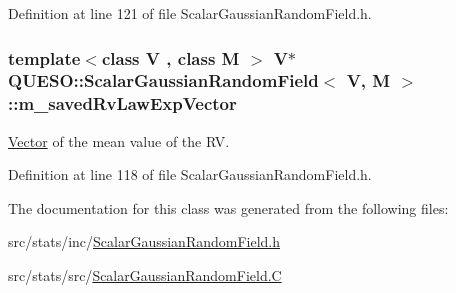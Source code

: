 Definition at line 121 of file Scalar\-Gaussian\-Random\-Field.\-h.

\hypertarget{class_q_u_e_s_o_1_1_scalar_gaussian_random_field_a0a59f8828711e204296d1cfb0ad6260a}{
\subsubsection[{m\-\_\-saved\-Rv\-Law\-Exp\-Vector}]{\setlength{\rightskip}{0pt plus 5cm}template$<$class V , class M $>$ V$\ast$ {\bf Q\-U\-E\-S\-O\-::\-Scalar\-Gaussian\-Random\-Field}$<$ V, M $>$\-::m\-\_\-saved\-Rv\-Law\-Exp\-Vector\hspace{0.3cm}{\ttfamily [protected]}}}\label{class_q_u_e_s_o_1_1_scalar_gaussian_random_field_a0a59f8828711e204296d1cfb0ad6260a}


\hyperlink{class_q_u_e_s_o_1_1_vector}{Vector} of the mean value of the R\-V. 



Definition at line 118 of file Scalar\-Gaussian\-Random\-Field.\-h.



The documentation for this class was generated from the following files\-:\begin{DoxyCompactItemize}
\item 
src/stats/inc/\hyperlink{_scalar_gaussian_random_field_8h}{Scalar\-Gaussian\-Random\-Field.\-h}\item 
src/stats/src/\hyperlink{_scalar_gaussian_random_field_8_c}{Scalar\-Gaussian\-Random\-Field.\-C}\end{DoxyCompactItemize}
